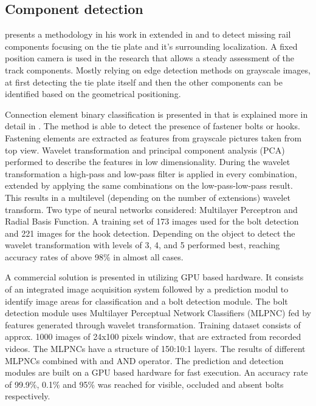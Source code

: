 \documentclass[10pt, final]{article}
\begin{document}
\subsection{Component detection}
\citeauthor{li_component-based_2011} presents a methodology in his work in \cite{li_component-based_2011}
extended in \cite{trinh_enhanced_2012} and \cite{ying_li_rail_2014} to detect missing rail components
focusing on the tie plate and it's surrounding localization.
A fixed position camera is used in the research that allows a steady assessment of the track components.
Mostly relying on edge detection methods on grayscale images,
at first detecting the tie plate itself and then the other components can be identified
based on the geometrical positioning.

Connection element binary classification is presented in \cite{mazzeo_visual_2004} that is explained more
in detail in \cite{marino_real-time_2007}.
The method is able to detect the presence of fastener bolts or hooks.
Fastening elements are extracted as features from grayscale pictures taken from top view.
Wavelet transformation and principal component analysis (PCA) performed to describe the features
in low dimensionality.
During the wavelet transformation a high-pass and low-pass filter is applied in every combination,
extended by applying the same combinations on the low-pass-low-pass result.
This results in a multilevel (depending on the number of extensions) wavelet transform.
Two type of neural networks considered: Multilayer Perceptron and Radial Basis Function.
A training set of 173 images used for the bolt detection and 221 images for the hook detection.
Depending on the object to detect the wavelet transformation with levels of 3, 4, and 5 performed best,
reaching accuracy rates of above 98\% in almost all cases.

A commercial solution is presented in \cite{de_ruvo_gpu-based_2009} utilizing GPU based hardware.
It consists of an integrated image acquisition system followed by a prediction modul to identify image areas
for classification and a bolt detection module.
The bolt detection module uses Multilayer Perceptual Network Classifiers (MLPNC) fed by features generated
through wavelet transformation.
Training dataset consists of approx. 1000 images of 24x100 pixels window, that are extracted from recorded
videos.
The MLPNCs have a structure of 150:10:1 layers.
The results of different MLPNCs combined with and AND operator.
The prediction and detection modules are built on a GPU based hardware for fast execution.
An accuracy rate of 99.9\%, 0.1\% and 95\% was reached for visible, occluded and absent bolts
respectively.
\end{document}
